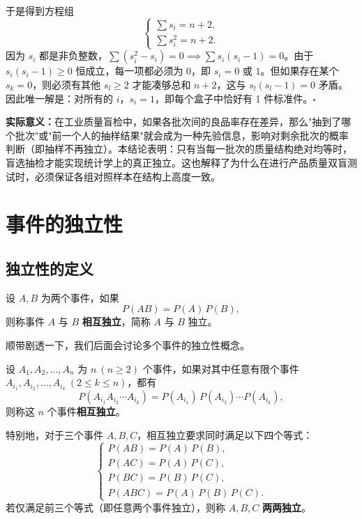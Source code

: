 ﻿\documentclass[lang=cn,11pt]{elegantbook}
\begin{document}
\begin{solution}
于是得到方程组
\[
\begin{cases}
\displaystyle\sum s_i = n+2, \\[6pt]
\displaystyle\sum s_i^2 = n+2.
\end{cases}
\]
因为 \(s_i\) 都是非负整数，\(\sum(s_i^2-s_i)=0 \implies \sum s_i(s_i-1)=0\)。由于 \(s_i(s_i-1) \ge 0\) 恒成立，每一项都必须为 0，即 \(s_i = 0\) 或 \(1\)。但如果存在某个 \(s_k = 0\)，则必须有其他 \(s_l \ge 2\) 才能凑够总和 \(n+2\)，这与 \(s_l(s_l-1)=0\) 矛盾。因此唯一解是：对所有的 \(i\)，\(s_i = 1\)，即每个盒子中恰好有 1 件标准件。\hfill\(\square\)

\textbf{实际意义：}在工业质量盲检中，如果各批次间的良品率存在差异，那么"抽到了哪个批次"或"前一个人的抽样结果"就会成为一种先验信息，影响对剩余批次的概率判断（即抽样不再独立）。本结论表明：只有当每一批次的质量结构绝对均等时，盲选抽检才能实现统计学上的真正独立。这也解释了为什么在进行产品质量双盲测试时，必须保证各组对照样本在结构上高度一致。
\end{solution}


\section{事件的独立性}

\subsection{独立性的定义}

\begin{definition}[事件的独立性] \label{def:independence}
设 \(A, B\) 为两个事件，如果
\[
P(AB) = P(A)\,P(B),
\]
则称事件 \(A\) 与 \(B\) \textbf{相互独立}，简称 \(A\) 与 \(B\) 独立。
\end{definition}
顺带剧透一下，我们后面会讨论多个事件的独立性概念。
\begin{definition}[$n$ 个事件的相互独立] \label{def:n-event-independence}
设 \(A_1, A_2, \dots, A_n\) 为 \(n\ (n \ge 2)\) 个事件，如果对其中任意有限个事件 \(A_{i_1}, A_{i_2}, \dots, A_{i_k}\ (2 \le k \le n)\)，都有
\[
P(A_{i_1} A_{i_2} \cdots A_{i_k}) = P(A_{i_1})\,P(A_{i_2}) \cdots P(A_{i_k}),
\]
则称这 \(n\) 个事件\textbf{相互独立}。
\end{definition}

特别地，对于三个事件 \(A, B, C\)，相互独立要求同时满足以下四个等式：
\[
\begin{cases}
P(AB) = P(A)\,P(B), \\
P(AC) = P(A)\,P(C), \\
P(BC) = P(B)\,P(C), \\
P(ABC) = P(A)\,P(B)\,P(C).
\end{cases}
\]
若仅满足前三个等式（即任意两个事件独立），则称 \(A, B, C\) \textbf{两两独立}。
\end{document}
